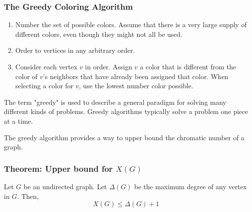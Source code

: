 \subsubsection*{The Greedy Coloring Algorithm}
\begin{enumerate}
  \item Number the set of possible colors. Assume that there is a very large supply of different colors, even though they might not all be used.
  \item Order to vertices in any arbitrary order.
  \item Consider each vertex $v$ in order. Assign $v$ a color that is different from the color of $v$'s neighbors that have already been assigned that color. When selecting a color for $v$, use the lowest number color possible.
\end{enumerate}
The term "greedy" is used to describe a general paradigm for solving many different kinds of problems. Greedy algorithms typically solve a problem one piece at a time.

The greedy algorithm provides a way to upper bound the chromatic number of a graph.

\subsubsection*{Theorem: Upper bound for $X(G)$}
Let $G$ be an undirected graph. Let $\Delta(G)$ be the maximum degree of any vertex in $G$. Then,
\[
  X(G) \leq \Delta(G)+1
\]